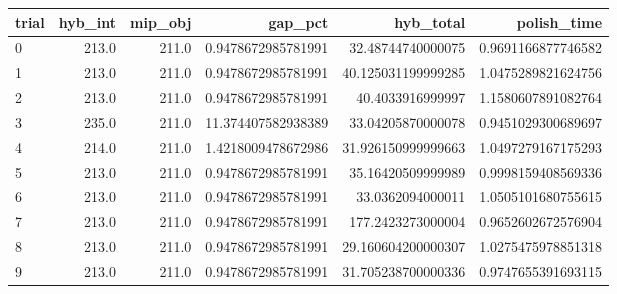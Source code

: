 \begin{tabular}{lrrrrr}
\hline
trial & hyb_int & mip_obj & gap_pct & hyb_total & polish_time \\ \hline
0 & 213.0 & 211.0 & 0.9478672985781991 & 32.48744740000075 & 0.9691166877746582 \\
1 & 213.0 & 211.0 & 0.9478672985781991 & 40.125031199999285 & 1.0475289821624756 \\
2 & 213.0 & 211.0 & 0.9478672985781991 & 40.4033916999997 & 1.1580607891082764 \\
3 & 235.0 & 211.0 & 11.374407582938389 & 33.04205870000078 & 0.9451029300689697 \\
4 & 214.0 & 211.0 & 1.4218009478672986 & 31.926150999999663 & 1.0497279167175293 \\
5 & 213.0 & 211.0 & 0.9478672985781991 & 35.16420509999989 & 0.9998159408569336 \\
6 & 213.0 & 211.0 & 0.9478672985781991 & 33.0362094000011 & 1.0505101680755615 \\
7 & 213.0 & 211.0 & 0.9478672985781991 & 177.2423273000004 & 0.9652602672576904 \\
8 & 213.0 & 211.0 & 0.9478672985781991 & 29.160604200000307 & 1.0275475978851318 \\
9 & 213.0 & 211.0 & 0.9478672985781991 & 31.705238700000336 & 0.9747655391693115 \\
\hline
\end{tabular}
